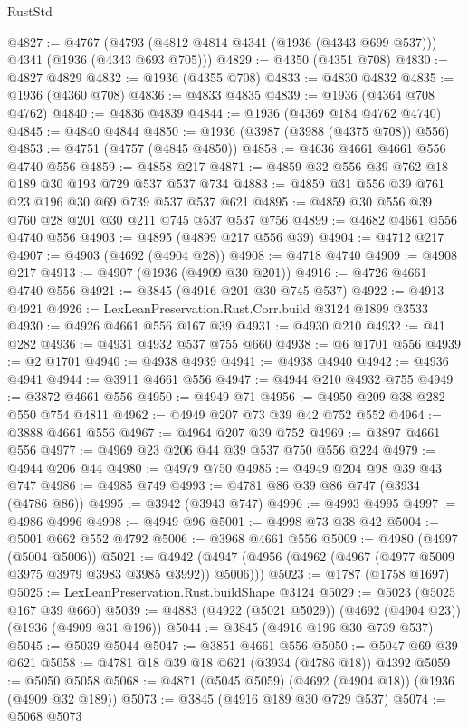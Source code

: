 \begin{lexlean}{RustStd}
\begin{coremodule}
@4827 := @4767 (@4793 (@4812 @4814 @4341 (@1936 (@4343 @699 @537))) @4341 (@1936 (@4343 @693 @705)))
@4829 := @4350 (@4351 @708)
@4830 := @4827 @4829
@4832 := @1936 (@4355 @708)
@4833 := @4830 @4832
@4835 := @1936 (@4360 @708)
@4836 := @4833 @4835
@4839 := @1936 (@4364 @708 @4762)
@4840 := @4836 @4839
@4844 := @1936 (@4369 @184 @4762 @4740)
@4845 := @4840 @4844
@4850 := @1936 (@3987 (@3988 (@4375 @708)) @556)
@4853 := @4751 (@4757 (@4845 @4850))
@4858 := @4636 @4661 @4661 @556 @4740 @556
@4859 := @4858 @217
@4871 := @4859 @32 @556 @39 @762 @18 @189 @30 @193 @729 @537 @537 @734
@4883 := @4859 @31 @556 @39 @761 @23 @196 @30 @69 @739 @537 @537 @621
@4895 := @4859 @30 @556 @39 @760 @28 @201 @30 @211 @745 @537 @537 @756
@4899 := @4682 @4661 @556 @4740 @556
@4903 := @4895 (@4899 @217 @556 @39)
@4904 := @4712 @217
@4907 := @4903 (@4692 (@4904 @28))
@4908 := @4718 @4740
@4909 := @4908 @217
@4913 := @4907 (@1936 (@4909 @30 @201))
@4916 := @4726 @4661 @4740 @556
@4921 := @3845 (@4916 @201 @30 @745 @537)
@4922 := @4913 @4921
@4926 := LexLeanPreservation.Rust.Corr.build @3124 @1899 @3533
@4930 := @4926 @4661 @556 @167 @39
@4931 := @4930 @210
@4932 := @41 @282
@4936 := @4931 @4932 @537 @755 @660
@4938 := @6 @1701 @556
@4939 := @2 @1701
@4940 := @4938 @4939
@4941 := @4938 @4940
@4942 := @4936 @4941
@4944 := @3911 @4661 @556
@4947 := @4944 @210 @4932 @755
@4949 := @3872 @4661 @556
@4950 := @4949 @71
@4956 := @4950 @209 @38 @282 @550 @754 @4811
@4962 := @4949 @207 @73 @39 @42 @752 @552
@4964 := @3888 @4661 @556
@4967 := @4964 @207 @39 @752
@4969 := @3897 @4661 @556
@4977 := @4969 @23 @206 @44 @39 @537 @750 @556 @224
@4979 := @4944 @206 @44
@4980 := @4979 @750
@4985 := @4949 @204 @98 @39 @43 @747
@4986 := @4985 @749
@4993 := @4781 @86 @39 @86 @747 (@3934 (@4786 @86))
@4995 := @3942 (@3943 @747)
@4996 := @4993 @4995
@4997 := @4986 @4996
@4998 := @4949 @96
@5001 := @4998 @73 @38 @42
@5004 := @5001 @662 @552 @4792
@5006 := @3968 @4661 @556
@5009 := @4980 (@4997 (@5004 @5006))
@5021 := @4942 (@4947 (@4956 (@4962 (@4967 (@4977 @5009 @3975 @3979 @3983 @3985 @3992)) @5006)))
@5023 := @1787 (@1758 @1697)
@5025 := LexLeanPreservation.Rust.buildShape @3124
@5029 := @5023 (@5025 @167 @39 @660)
@5039 := @4883 (@4922 (@5021 @5029)) (@4692 (@4904 @23)) (@1936 (@4909 @31 @196))
@5044 := @3845 (@4916 @196 @30 @739 @537)
@5045 := @5039 @5044
@5047 := @3851 @4661 @556
@5050 := @5047 @69 @39 @621
@5058 := @4781 @18 @39 @18 @621 (@3934 (@4786 @18)) @4392
@5059 := @5050 @5058
@5068 := @4871 (@5045 @5059) (@4692 (@4904 @18)) (@1936 (@4909 @32 @189))
@5073 := @3845 (@4916 @189 @30 @729 @537)
@5074 := @5068 @5073

\end{coremodule}
\end{lexlean}
